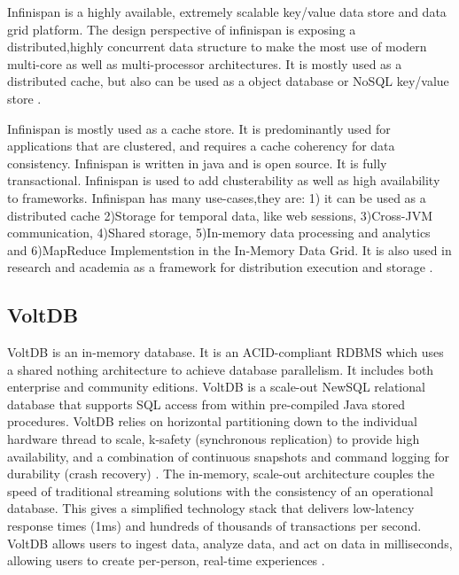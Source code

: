      Infinispan is a highly available, extremely scalable key/value data
     store and data grid platform. The design perspective of
     infinispan is exposing a distributed,highly concurrent data
     structure to make the most use of modern multi-core as well as
     multi-processor architectures. It is mostly used as a distributed
     cache, but also can be used as a object database or NoSQL
     key/value store \cite{infinispan.org}.

     Infinispan is mostly used as a cache store. It is predominantly
     used for applications that are clustered, and requires a cache
     coherency for data consistency. Infinispan is written in java and
     is open source. It is fully transactional. Infinispan is used to
     add clusterability as well as high availability to frameworks.
     Infinispan has many use-cases,they are: 1) it can be used as a
     distributed cache 2)Storage for temporal data, like web sessions,
     3)Cross-JVM communication, 4)Shared storage, 5)In-memory data
     processing and analytics and 6)MapReduce Implementstion in the
     In-Memory Data Grid. It is also used in research and academia as
     a framework for distribution execution and
     storage \cite{infinispan_wikipedia}.
     
\subsection{VoltDB}

     VoltDB is an in-memory database. It is an ACID-compliant RDBMS
     which uses a shared nothing architecture to achieve database
     parallelism. It includes both enterprise and community
     editions. VoltDB is a scale-out NewSQL relational database that
     supports SQL access from within pre-compiled Java stored
     procedures.  VoltDB relies on horizontal partitioning down to the
     individual hardware thread to scale, k-safety (synchronous
     replication) to provide high availability, and a combination of
     continuous snapshots and command logging for durability (crash
     recovery) \cite{www-voltdb}. The in-memory, scale-out
     architecture couples the speed of traditional streaming solutions
     with the consistency of an operational database. This gives a
     simplified technology stack that delivers low-latency response
     times (1ms) and hundreds of thousands of transactions per
     second. VoltDB allows users to ingest data, analyze data, and act
     on data in milliseconds, allowing users to create per-person,
     real-time experiences \cite{www-voltdb}.

